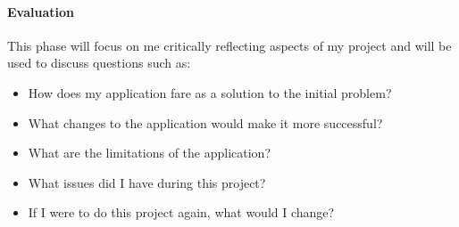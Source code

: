\paragraph{Evaluation}
This phase will focus on me critically reflecting aspects of my project and will be used to discuss questions such as:

\begin{itemize}
  \item How does my application fare as a solution to the initial problem?
  \item What changes to the application would make it more successful?
  \item What are the limitations of the application?
  \item What issues did I have during this project?
  \item If I were to do this project again, what would I change?
\end{itemize}
